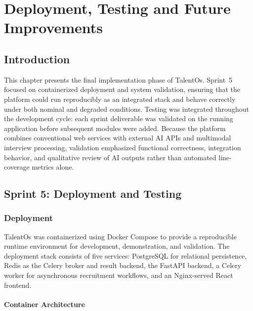 \chapter{Deployment, Testing and Future Improvements} \label{chap5}
\minitoc
\newpage

\section*{Introduction}
This chapter presents the final implementation phase of TalentOs. Sprint~5 focused on containerized deployment and system validation, ensuring that the platform could run reproducibly as an integrated stack and behave correctly under both nominal and degraded conditions. Testing was integrated throughout the development cycle: each sprint deliverable was validated on the running application before subsequent modules were added. Because the platform combines conventional web services with external AI APIs and multimodal interview processing, validation emphasized functional correctness, integration behavior, and qualitative review of AI outputs rather than automated line-coverage metrics alone.

\section{Sprint 5: Deployment and Testing}
\label{sec:ch5:sprint5}

\subsection{Deployment}
\label{sec:ch5:deployment}

TalentOs was containerized using Docker Compose to provide a reproducible runtime environment for development, demonstration, and validation. The deployment stack consists of five services: PostgreSQL for relational persistence, Redis as the Celery broker and result backend, the FastAPI backend, a Celery worker for asynchronous recruitment workflows, and an Nginx-served React frontend.

\subsubsection{Container Architecture}

